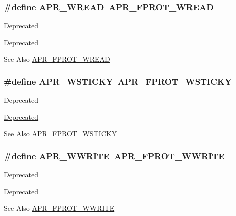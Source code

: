 \hypertarget{group__apr__file__permissions_ga5c987d2b1ace95b4ffa7c5a322721aad}{
\subsubsection[{A\-P\-R\-\_\-\-W\-R\-E\-A\-D}]{\setlength{\rightskip}{0pt plus 5cm}\#define A\-P\-R\-\_\-\-W\-R\-E\-A\-D~{\bf A\-P\-R\-\_\-\-F\-P\-R\-O\-T\-\_\-\-W\-R\-E\-A\-D}}}\label{group__apr__file__permissions_ga5c987d2b1ace95b4ffa7c5a322721aad}
\begin{DoxyRefDesc}{Deprecated}
\item[\hyperlink{deprecated__deprecated000012}{Deprecated}]\end{DoxyRefDesc}
\begin{DoxySeeAlso}{See Also}
\hyperlink{group__apr__file__permissions_ga194718630250b0f0dd4be38c86dac717}{A\-P\-R\-\_\-\-F\-P\-R\-O\-T\-\_\-\-W\-R\-E\-A\-D} 
\end{DoxySeeAlso}
\hypertarget{group__apr__file__permissions_ga824d6685d59e3efddb6ee7fdbee69c13}{
\subsubsection[{A\-P\-R\-\_\-\-W\-S\-T\-I\-C\-K\-Y}]{\setlength{\rightskip}{0pt plus 5cm}\#define A\-P\-R\-\_\-\-W\-S\-T\-I\-C\-K\-Y~{\bf A\-P\-R\-\_\-\-F\-P\-R\-O\-T\-\_\-\-W\-S\-T\-I\-C\-K\-Y}}}\label{group__apr__file__permissions_ga824d6685d59e3efddb6ee7fdbee69c13}
\begin{DoxyRefDesc}{Deprecated}
\item[\hyperlink{deprecated__deprecated000011}{Deprecated}]\end{DoxyRefDesc}
\begin{DoxySeeAlso}{See Also}
\hyperlink{group__apr__file__permissions_ga989dbea02f779a5f20a643d7e4ee9952}{A\-P\-R\-\_\-\-F\-P\-R\-O\-T\-\_\-\-W\-S\-T\-I\-C\-K\-Y} 
\end{DoxySeeAlso}
\hypertarget{group__apr__file__permissions_ga7aac61689e9aaa93176bdb4911f56863}{
\subsubsection[{A\-P\-R\-\_\-\-W\-W\-R\-I\-T\-E}]{\setlength{\rightskip}{0pt plus 5cm}\#define A\-P\-R\-\_\-\-W\-W\-R\-I\-T\-E~{\bf A\-P\-R\-\_\-\-F\-P\-R\-O\-T\-\_\-\-W\-W\-R\-I\-T\-E}}}\label{group__apr__file__permissions_ga7aac61689e9aaa93176bdb4911f56863}
\begin{DoxyRefDesc}{Deprecated}
\item[\hyperlink{deprecated__deprecated000013}{Deprecated}]\end{DoxyRefDesc}
\begin{DoxySeeAlso}{See Also}
\hyperlink{group__apr__file__permissions_ga51692a9828f5b6288d89495378944260}{A\-P\-R\-\_\-\-F\-P\-R\-O\-T\-\_\-\-W\-W\-R\-I\-T\-E} 
\end{DoxySeeAlso}
